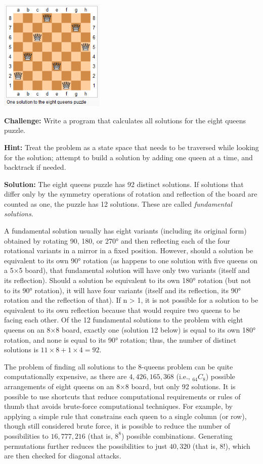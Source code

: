 \documentclass[11pt,a4paper]{article}
\begin{document}
\begin{center}
  \includegraphics[width=5cm]{8-queens.png}
\end{center}

\textbf{Challenge:} Write a program that calculates all solutions for the
eight queens puzzle.

\textbf{Hint:} Treat the problem as a state space that needs to be traversed
while looking for the solution; attempt to build a solution by adding one
queen at a time, and backtrack if needed.

\textbf{Solution:} The eight queens puzzle has 92 distinct solutions. If
solutions that differ only by the symmetry operations of rotation and
reflection of the board are counted as one, the puzzle has 12 solutions. These
are called \emph{fundamental solutions}.

A fundamental solution usually has eight variants (including its original
form) obtained by rotating 90, 180, or 270° and then reflecting each of the
four rotational variants in a mirror in a fixed position. However, should a
solution be equivalent to its own 90° rotation (as happens to one solution
with five queens on a 5×5 board), that fundamental solution will have only two
variants (itself and its reflection). Should a solution be equivalent to its
own 180° rotation (but not to its 90° rotation), it will have four variants
(itself and its reflection, its 90° rotation and the reflection of that). If n
> 1, it is not possible for a solution to be equivalent to its own reflection
because that would require two queens to be facing each other. Of the 12
fundamental solutions to the problem with eight queens on an 8×8 board,
exactly one (solution 12 below) is equal to its own 180° rotation, and none is
equal to its 90° rotation; thus, the number of distinct solutions is $11\times
8 + 1\times 4 = 92$.

The problem of finding all solutions to the 8-queens problem can be quite
computationally expensive, as there are $4,426,165,368$ (i.e., ${}_{64}C_8$)
possible arrangements of eight queens on an 8×8 board, but only 92 solutions.
It is possible to use shortcuts that reduce computational requirements or
rules of thumb that avoids brute-force computational techniques. For example,
by applying a simple rule that constrains each queen to a single column (or
row), though still considered brute force, it is possible to reduce the number
of possibilities to $16,777,216$ (that is, $8^8$) possible combinations.
Generating permutations further reduces the possibilities to just $40,320$
(that is, $8!$), which are then checked for diagonal attacks. 
\end{document}
